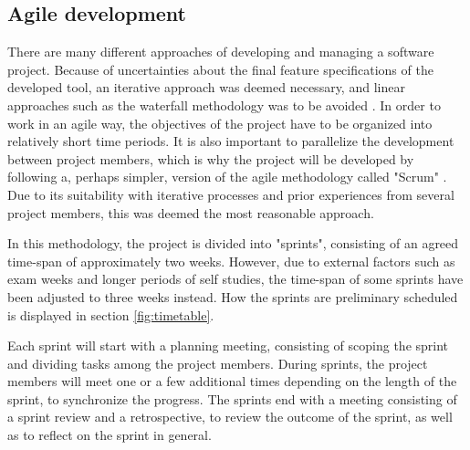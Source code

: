 \subsection{Agile development}
There are many different approaches of developing and managing a software project. Because of uncertainties about the final feature specifications of the developed tool, an iterative approach was deemed necessary, and linear approaches such as the waterfall methodology was to be avoided \cite{Waterfall}. In order to work in an agile way, the objectives of the project have to be organized into relatively short time periods. It is also important to parallelize the development between project members, which is why the project will be developed by following a, perhaps simpler, version of the agile methodology called "Scrum" \cite{Scrum}. Due to its suitability with iterative processes and prior experiences from several project members, this was deemed the most reasonable approach.

In this methodology, the project is divided into "sprints", consisting of an agreed time-span of approximately two weeks. However, due to external factors such as exam weeks and longer periods of self studies, the time-span of some sprints have been adjusted to three weeks instead. How the sprints are preliminary scheduled is displayed in section \ref{fig:timetable}.

Each sprint will start with a planning meeting, consisting of scoping the sprint and dividing tasks among the project members. During sprints, the project members will meet one or a few additional times depending on the length of the sprint, to synchronize the progress. The sprints end with a meeting consisting of a sprint review and a retrospective, to review the outcome of the sprint, as well as to reflect on the sprint in general.